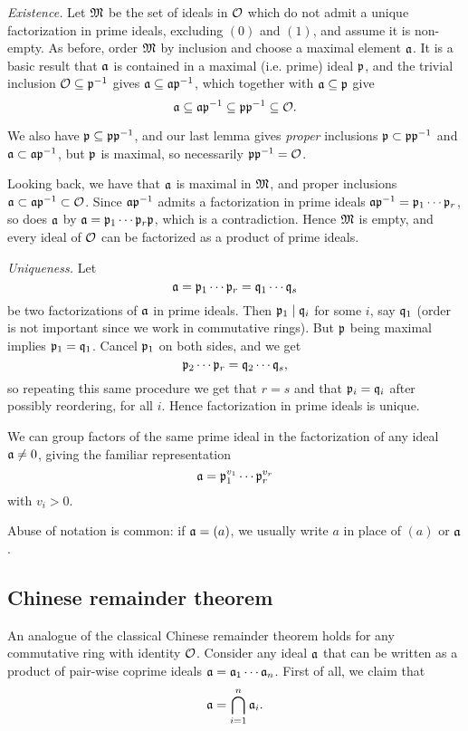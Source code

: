 \emph{Existence.} Let $\mathfrak{M}$ be the set of ideals in $\mathcal{O}$ which do not admit a unique factorization in prime ideals, excluding $(0)$ and $(1)$, and assume it is non-empty. As before, order $\mathfrak{M}$ by inclusion and choose a maximal element $\mathfrak{a}$. It is a basic result that $\mathfrak{a}$ is contained in a maximal (i.e. prime) ideal $\mathfrak{p}$, and the trivial inclusion $\mathcal{O}\subseteq\mathfrak{p}^{-1}$ gives $\mathfrak{a}\subseteq\mathfrak{a}\mathfrak{p}^{-1}$, which together with $\mathfrak{a}\subseteq\mathfrak{p}$ give
\[
	\mathfrak{a}\subseteq\mathfrak{a}\mathfrak{p}^{-1}\subseteq\mathfrak{p}\mathfrak{p}^{-1}\subseteq\mathcal{O}.
\]

We also have $\mathfrak{p}\subseteq\mathfrak{p}\mathfrak{p}^{-1}$, and our last lemma gives \emph{proper} inclusions $\mathfrak{p}\subset\mathfrak{p}\mathfrak{p}^{-1}$ and $\mathfrak{a}\subset\mathfrak{a}\mathfrak{p}^{-1}$, but $\mathfrak{p}$ is maximal, so necessarily $\mathfrak{p}\mathfrak{p}^{-1}=\mathcal{O}$.

Looking back, we have that $\mathfrak{a}$ is maximal in $\mathfrak{M}$, and proper inclusions $\mathfrak{a}\subset\mathfrak{a}\mathfrak{p}^{-1}\subset\mathcal{O}$. Since $\mathfrak{a}\mathfrak{p}^{-1}$ admits a factorization in prime ideals $\mathfrak{a}\mathfrak{p}^{-1}=\mathfrak{p}_1\cdots\mathfrak{p}_r$, so does $\mathfrak{a}$ by $\mathfrak{a}=\mathfrak{p}_1\cdots\mathfrak{p}_r\mathfrak{p}$, which is a contradiction. Hence $\mathfrak{M}$ is empty, and every ideal of $\mathcal{O}$ can be factorized as a product of prime ideals.

\emph{Uniqueness.} Let
\[
	\mathfrak{a} = \mathfrak{p}_1\cdots\mathfrak{p}_r = \mathfrak{q}_1\cdots\mathfrak{q}_s
\]
be two factorizations of $\mathfrak{a}$ in prime ideals. Then $\mathfrak{p}_1\mid\mathfrak{q}_i$ for some $i$, say $\mathfrak{q}_1$ (order is not important since we work in commutative rings). But $\mathfrak{p}$ being maximal implies $\mathfrak{p}_1=\mathfrak{q}_1$. Cancel $\mathfrak{p}_1$ on both sides, and we get
\[
	\mathfrak{p}_2\cdots\mathfrak{p}_r = \mathfrak{q}_2\cdots\mathfrak{q}_s,
\]
so repeating this same procedure we get that $r=s$ and that $\mathfrak{p}_i=\mathfrak{q}_i$ after possibly reordering, for all $i$. Hence factorization in prime ideals is unique.

We can group factors of the same prime ideal in the factorization of any ideal $\mathfrak{a}\neq 0$, giving the familiar representation
\[
	\mathfrak{a} = \mathfrak{p}_1^{v_1}\cdots\mathfrak{p}_r^{v_r}
\]
with $v_i>0$.

Abuse of notation is common: if $\mathfrak{a}=(a)$, we usually write $a$ in place of $(a)$ or $\mathfrak{a}$.

\subsection{Chinese remainder theorem}

An analogue of the classical Chinese remainder theorem holds for any commutative ring with identity $\mathcal{O}$. Consider any ideal $\mathfrak{a}$ that can be written as a product of pair-wise coprime ideals $\mathfrak{a}=\mathfrak{a}_1\cdots\mathfrak{a}_n$. First of all, we claim that
\[
	\mathfrak{a} = \bigcap_{i=1}^n \mathfrak{a}_i.
\]

